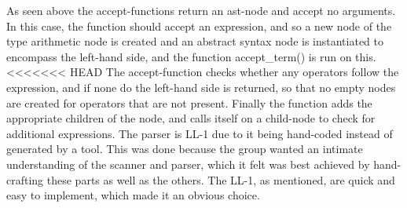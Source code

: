 As seen above the accept-functions return an \ac{ast}-node and accept no arguments. In this case, the function should accept an expression, and so a new node of the type arithmetic node is created and an abstract syntax node is instantiated to encompass the left-hand side, and the function accept\_term() is run on this. 
<<<<<<< HEAD
\vspace{10pt}
The accept-function checks whether any operators follow the expression, and if none do the left-hand side is returned, so that no empty nodes are created for operators that are not present.
\vspace{10pt}
Finally the function adds the appropriate children of the node, and calls itself on a child-node to check for additional expressions.
\vspace{10pt}
The parser is LL-1 due to it being hand-coded instead of generated by a tool. This was done because the group wanted an intimate understanding of the scanner and parser, which it felt was best achieved by hand-crafting these parts as well as the others. The LL-1, as mentioned, are quick and easy to implement, which made it an obvious choice.
